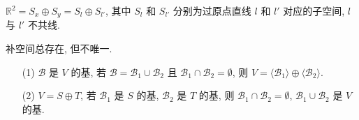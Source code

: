 \documentclass{note}
\begin{document}
\begin{eg}
    $\mathbb{R}^2=S_x\oplus S_y=S_l\oplus S_{l'}$, 其中 $S_l$ 和 $S_{l'}$ 分别为过原点直线 $l$ 和 $l'$ 对应的子空间, $l$ 与 $l'$ 不共线.
\end{eg}

补空间总存在, 但不唯一.

\begin{thm}[(课本定理 1.13)]
    \begin{itemize}
        \item[(1)] $\mathcal{B}$ 是 $V$ 的基, 若 $\mathcal{B}=\mathcal{B}_1\cup\mathcal{B}_2$ 且 $\mathcal{B}_1\cap\mathcal{B}_2=\emptyset$, 则 $V=\langle\mathcal{B}_1\rangle\oplus\langle\mathcal{B}_2\rangle$.
        \item[(2)] $V=S\oplus T$, 若 $\mathcal{B}_1$ 是 $S$ 的基, $\mathcal{B}_2$ 是 $T$ 的基, 则 $\mathcal{B}_1\cap\mathcal{B}_2=\emptyset$, $\mathcal{B}_1\cup\mathcal{B}_2$ 是 $V$ 的基.
    \end{itemize}
\end{thm}
\end{document}
